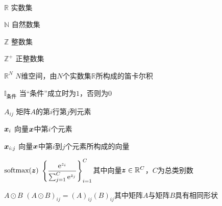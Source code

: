 \clearpage


\titlespacing{\chapter}{0pt}{0mm}{5mm}



\begin{labeling}{~~~~~~~~~~~~~~~~~~~~~}
\setlength{\parskip}{0pt plus1pt minus1pt}
\item [$\mathbb{R}$] 实数集
\item [$\mathbb{N}$] 自然数集
\item [$\mathbb{Z}$] 整数集
\item [$\mathbb{Z}^+$] 正整数集
\item [$\mathbb{R}^N$] $N$维空间，由$N$个实数集$\mathbb{R}$所构成的笛卡尔积
\item [$\mathbb{I}_{\text{条件}}$] 当“条件”成立时为$1$，否则为$0$
\item [$A_{ij}$] 矩阵$A$的第$i$行第$j$列元素
\item [$\boldsymbol{x}_i$] 向量$\boldsymbol{x}$中第$i$个元素
\item [$\boldsymbol{x}_{i:j}$] 向量$\boldsymbol{x}$中第$i$到$j$个元素所构成的向量
\item [$\text{softmax}(\boldsymbol{z})$] $\displaystyle\left\{\frac{\mathrm{e}^{z_i}}{\sum_{j=1}^C\mathrm{e}^{z_j}}\right\}_{i=1}^C$其中向量$\boldsymbol{z}\in\mathbb{R}^{C}$，$C$为总类别数
\item [$A\odot B$] $(A\odot B)_{ij} = (A)_{ij}(B)_{ij}$其中矩阵$A$与矩阵$B$具有相同形状

\end{labeling}
\titlespacing{\chapter}{0pt}{-6mm}{5mm}
\let\cleardoublepage\clearpage  %
